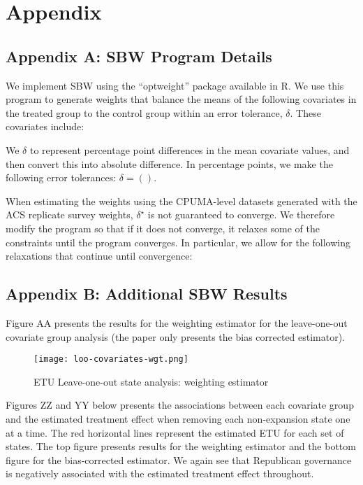 \documentclass[final]{article}
\begin{document}
\cleardoublepage
 

\cleardoublepage

\section{Appendix}

\subsection{Appendix A: SBW Program Details}

We implement SBW using the ``optweight'' package available in R. We use this program to generate weights that balance the means of the following covariates in the treated group to the control group within an error tolerance, $\delta$. These covariates include:

We $\delta$ to represent percentage point differences in the mean covariate values, and then convert this into absolute difference. In percentage points, we make the following error tolerances: $\delta = ()$.

When estimating the weights using the CPUMA-level datasets generated with the ACS replicate survey weights, $\delta^\star$ is not guaranteed to converge. We therefore modify the program so that if it does not converge, it relaxes some of the constraints until the program converges. In particular, we allow for the following relaxations that continue until convergence:

\subsection{Appendix B: Additional SBW Results}

Figure AA presents the results for the weighting estimator for the leave-one-out covariate group analysis (the paper only presents the bias corrected estimator).

\begin{figure}[H]
    \texttt{[image: loo-covariates-wgt.png]}
    \caption{ETU Leave-one-out state analysis: weighting estimator}
\end{figure}


Figures ZZ and YY below presents the associations between each covariate group and the estimated treatment effect when removing each non-expansion state one at a time. The red horizontal lines represent the estimated ETU for each set of states. The top figure presents results for the weighting estimator and the bottom figure for the bias-corrected estimator. We again see that Republican governance is negatively associated with the estimated treatment effect throughout.
\end{document}
